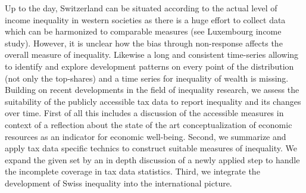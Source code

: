 \documentclass[twoside]{article}\usepackage[]{graphicx}\usepackage[]{color}
\begin{document}
\begin{multicols}{2}

Up to the day, Switzerland can be situated according to the actual level of income inequality in western societies as there is a huge effort to collect data which can be harmonized to comparable measures (see Luxembourg income study). However, it is unclear how the bias through non-response affects the overall measure of inequality. Likewise a long and consistent time-series allowing to identify and explore development patterns on every point of the distribution (not only the top-shares) and a time series for inequality of wealth is missing. Building on recent developments in the field of inequality research, we assess the suitability of the publicly accessible tax data to report inequality and its changes over time. First of all this includes a discussion of the accessible measures in context of a reflection about the state of the art conceptualization of economic resources as an indicator for economic well-being. Second, we summarize and apply tax data specific technics to construct suitable measures of inequality. We expand the given set by an in depth discussion of a newly applied step to handle the incomplete coverage in tax data statistics. Third, we integrate the development of Swiss inequality into the international picture.












\end{multicols}
\end{document}
